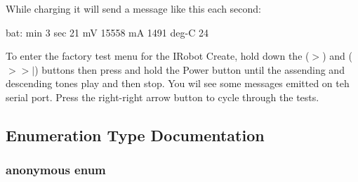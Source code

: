 While charging it will send a message like this each second: 
\begin{DoxyCode}
 bat:   min 3  sec 21  mV 15558  mA 1491  deg-C 24
\end{DoxyCode}


To enter the factory test menu for the IRobot Create, hold down the ($>$) and ($>$$>$$|$) buttons then press and hold the Power button until the assending and descending tones play and then stop. You wil see some messages emitted on teh serial port. Press the right-\/right arrow button to cycle through the tests. 

\subsection{Enumeration Type Documentation}
\hypertarget{namespacemasks_af347462787e0a87a423f606696c00f3c}{
\subsubsection[{"@0}]{\setlength{\rightskip}{0pt plus 5cm}anonymous enum}}
\label{namespacemasks_af347462787e0a87a423f606696c00f3c}
